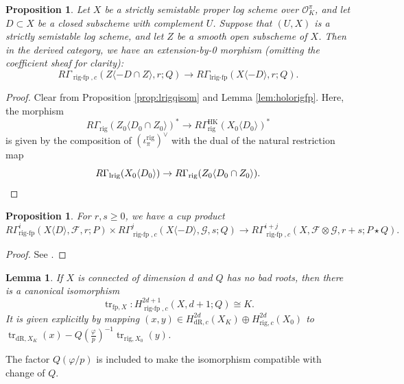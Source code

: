 \documentclass[cjm]{ipart}
\theoremstyle{plain}
\newtheorem{lemma}[theorem]{Lemma}
\newtheorem{proposition}[theorem]{Proposition}
\theoremstyle{remark}
\DeclareMathOperator{\HK}{HK}
\DeclareMathOperator{\lrigfp}{lrig-fp}
\DeclareMathOperator{\lrig}{lrig}
\DeclareMathOperator{\rigfp}{rig-fp}
\DeclareMathOperator{\tr}{tr}
\newcommand{\cO}{\mathcal{O}}
\newcommand{\dR}{\mathrm{dR}}
\newcommand{\rig}{\mathrm{rig}}
\newcommand{\sF}{\mathscr{F}}
\newcommand{\sG}{\mathscr{G}}
\numberwithin{equation}{subsection}
\renewcommand{\geq}{\geqslant}
\begin{document}
   \begin{proposition}\label{prop:extbyzero}
    Let $X$ be a strictly semistable proper log scheme over $\cO_K^\pi$, and let $D\subset X$ be a closed subscheme with complement $U$. Suppose that $(U,X)$ is a strictly semistable log scheme, and let $Z$ be a smooth open subscheme of $X$. Then in the derived category, we have an extension-by-0 morphism (omitting the coefficient sheaf for clarity):
    \[ R\Gamma_{\rigfp,c}(Z\langle -D \cap Z\rangle,r;Q)\to R\Gamma_{\lrigfp}(X\langle -D\rangle,r;Q).\]
   \end{proposition}
   \begin{proof}
    Clear from  Proposition \ref{prop:lrigqisom}  and Lemma \ref{lem:holorigfp}. Here, the morphism
    \[ R\Gamma_{\rig}(Z_0\langle D_0\cap Z_0\rangle)^*\to R\Gamma^{\HK}_{\rig}(X_0\langle D_0\rangle)^*\]
    is given by the composition of $(\iota_\pi^{\rig})^\vee$ with the dual of the natural restriction map
    \[ R\Gamma_{\lrig}(X_0\langle D_0\rangle)  \to R\Gamma_{\rig}(Z_0\langle D_0\cap Z_0\rangle).\qedhere\]
   \end{proof}


  \begin{proposition}\label{prop:rigfpcup}
   For $r,s\geq 0$, we have a cup product
   \[
    R\Gamma^i_{\rigfp}(X\langle D\rangle,\sF,r;P) \times R\Gamma^j_{\rigfp,c}(X\langle -D\rangle,\sG,s;Q)  \longrightarrow R\Gamma_{\rigfp,c}^{i+j}(X,\sF\otimes\sG,r+s;P\star Q).\label{eq:pairingrig}
   \]
  \end{proposition}
  \begin{proof}
   See \cite[\S 2]{besser12}.
  \end{proof}

  \begin{lemma}
   If $X$ is connected of dimension $d$ and $Q$ has no bad roots, then there is a canonical isomorphism
   \[ \tr_{\mathrm{fp},X}: H^{2d+1}_{\rigfp,c}(X,d+1;Q) \cong K. \]
   It is given explicitly by mapping $(x, y) \in H^{2d}_{\dR, c}(X_K) \oplus H^{2d}_{\rig, c}(X_0)$ to $\tr_{\dR, X_K}(x) - Q(\tfrac{\varphi}{p})^{-1} \tr_{\rig, X_0}(y)$.
  \end{lemma}

  \begin{remark}
   The factor $Q(\varphi/p)$ is included to make the isomorphism compatible with change of $Q$.
  \end{remark}
\end{document}
